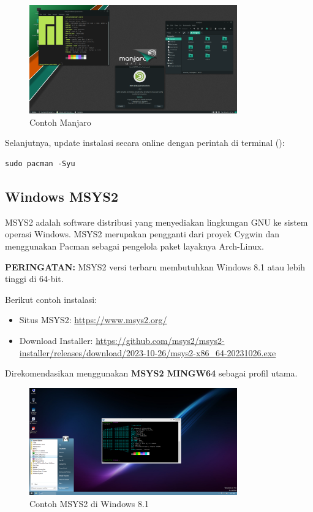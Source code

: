 \documentclass[12pt]{book}
\begin{document}
	\begin{figure}[!ht]
		\centering
		\includegraphics[width=0.8\textwidth]{images/os/manjaro}
		\caption{Contoh Manjaro}
	\end{figure}
	
	Selanjutnya, update instalasi secara online dengan perintah di terminal ():
	
	\begin{verbatim}
sudo pacman -Syu
	\end{verbatim}
	
	\subsection{Windows MSYS2}
	
	MSYS2 adalah software distribusi yang menyediakan lingkungan GNU ke sistem operasi Windows.
	MSYS2 merupakan pengganti dari proyek Cygwin dan menggunakan Pacman sebagai pengelola paket layaknya Arch-Linux.
	
	\textbf{PERINGATAN:} MSYS2 versi terbaru membutuhkan Windows 8.1 atau lebih tinggi di 64-bit.
	
	Berikut contoh instalasi:
	
	\begin{itemize}
		\item Situs MSYS2: \url{https://www.msys2.org/}
		
		\item Download Installer: \url{https://github.com/msys2/msys2-installer/releases/download/2023-10-26/msys2-x86_64-20231026.exe}
		
	\end{itemize}
	
	Direkomendasikan menggunakan \textbf{MSYS2 MINGW64} sebagai profil utama.
	
	\newpage
	\begin{figure}[!ht]
		\centering
		\includegraphics[width=0.8\textwidth]{images/os/msys2}
		\caption{Contoh MSYS2 di Windows 8.1}
	\end{figure}
	
\end{document}
